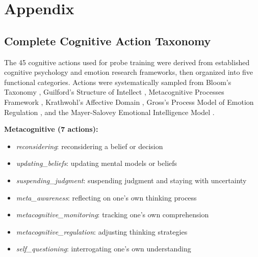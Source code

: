 \documentclass[letterpaper]{article}
\begin{document}


\appendix

\section{Appendix}

\subsection{Complete Cognitive Action Taxonomy}

The 45 cognitive actions used for probe training were derived from established cognitive psychology and emotion research frameworks, then organized into five functional categories. Actions were systematically sampled from Bloom's Taxonomy \cite{Anderson2001}, Guilford's Structure of Intellect \cite{Guilford1967}, Metacognitive Processes Framework \cite{Flavell1979}, Krathwohl's Affective Domain \cite{Krathwohl1964}, Gross's Process Model of Emotion Regulation \cite{Gross1998}, and the Mayer-Salovey Emotional Intelligence Model \cite{MayerSalovey1997}.

\textbf{Metacognitive (7 actions):}
\begin{itemize}
    \item \textit{reconsidering}: reconsidering a belief or decision
    \item \textit{updating\_beliefs}: updating mental models or beliefs
    \item \textit{suspending\_judgment}: suspending judgment and staying with uncertainty
    \item \textit{meta\_awareness}: reflecting on one's own thinking process
    \item \textit{metacognitive\_monitoring}: tracking one's own comprehension
    \item \textit{metacognitive\_regulation}: adjusting thinking strategies
    \item \textit{self\_questioning}: interrogating one's own understanding
\end{itemize}
\end{document}
